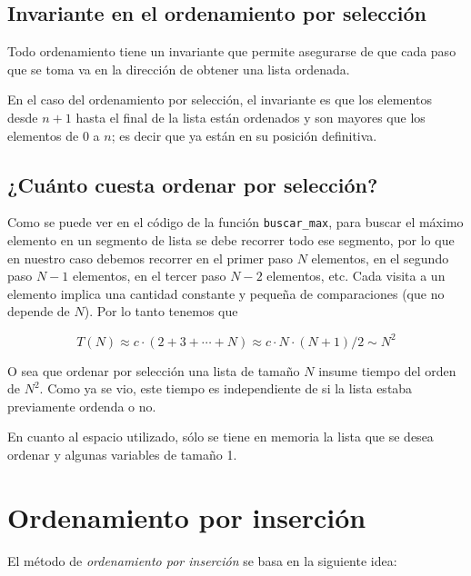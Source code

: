 \subsection{Invariante en el ordenamiento por selección}

Todo ordenamiento tiene un invariante que permite asegurarse de que cada
paso que se toma va en la dirección de obtener una lista ordenada.

En el caso del ordenamiento por selección, el invariante es que los
elementos desde $n + 1$ hasta el final de la lista están ordenados y
son mayores que los elementos de $0$ a $n$; es decir
que ya están en su posición definitiva.

\subsection{¿Cuánto cuesta ordenar por selección?}

Como se puede ver en el código de la función \lstinline!buscar_max!, para
buscar el máximo elemento en un segmento de lista se debe recorrer todo ese
segmento, por lo que en nuestro caso debemos recorrer en el primer paso $N$
elementos, en el segundo paso $N-1$ elementos, en el tercer paso $N-2$
elementos, etc. Cada visita a un elemento implica una cantidad constante y
pequeña de comparaciones (que no depende de $N$). Por lo tanto tenemos que

$$ T(N) \approx c \cdot (2 + 3 + \cdots + N) \approx c \cdot N \cdot (N+1)/2 \sim N^2 $$

O sea que ordenar por selección una lista de tamaño $N$ insume tiempo del
orden de $N^2$.  Como ya se vio, este tiempo es independiente de si la
lista estaba previamente ordenda o no.

En cuanto al espacio utilizado, sólo se tiene en memoria la
lista que se desea ordenar y algunas variables de tamaño 1.

\section{Ordenamiento por inserción}

El método de \emph{ordenamiento por inserción} se basa en la siguiente idea:

